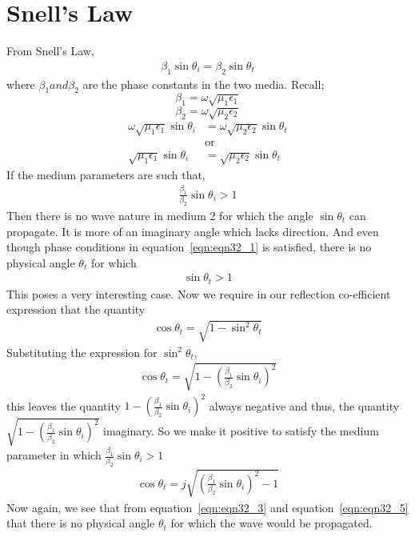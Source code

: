 \section{Snell's Law}
From Snell's Law,
\begin{align}
\beta_1 \sin\theta_i = \beta_2 \sin\theta_t
\label{eqn:eqn32_1}
\end{align}
where $\beta_1 and \beta_2$ are the phase constants in the two media. Recall;
$$ \beta_{1} = \omega\sqrt{\mu_{1}\epsilon_{1}}$$
$$ \beta_{2} = \omega\sqrt{\mu_{2}\epsilon_{2}}$$
\begin{align*}
\omega\sqrt{\mu_1\epsilon_{1}} \sin\theta_i &= \omega\sqrt{\mu_2\epsilon_2}  \sin\theta_t\\
&\text{or}\\
\sqrt{\mu_1\epsilon_{1}} \sin\theta_i &= \sqrt{\mu_2\epsilon_2}  \sin\theta_t
\end{align*}
If the medium parameters are such that,
\begin{align}
\frac{\beta_1}{\beta_2}\sin\theta_i > 1
\end{align}
Then there is no wave nature in medium 2 for which the angle $\sin\theta_t$ can propagate. It is more of an imaginary angle which lacks direction. And even though phase conditions in equation~\ref{eqn:eqn32_1} is satisfied, there is no physical angle $\theta_t$ for which
\begin{align}
\sin\theta_t > 1
\label{eqn:eqn32_3}
\end{align}
This poses a very interesting case. Now we require in our reflection co-efficient expression that the quantity
\begin{align}
\cos\theta_t = \sqrt{1-\sin^2\theta_t}
\end{align}
Substituting the expression for $\sin^{2}\theta_{t}$,
\begin{align*}
\cos\theta_t = \sqrt{1-(\frac{\beta_1}{\beta_2}\sin\theta_i)^2}
\end{align*}
this leaves the quantity $1 - (\frac{\beta_1}{\beta_2}\sin\theta_i)^2$ always negative and thus, the quantity $\sqrt{1 - (\frac{\beta_1}{\beta_2}\sin\theta_i)^2}$ imaginary. So we make it positive to satisfy the medium parameter in which $\frac{\beta_1}{\beta_2}\sin\theta_i > 1$
\begin{align}
\cos\theta_t = j\sqrt{(\frac{\beta_1}{\beta_2}\sin\theta_i)^2-1}
\label{eqn:eqn32_5}
\end{align}
Now again, we see that from equation~\ref{eqn:eqn32_3} and equation~\ref{eqn:eqn32_5} 
that there is no physical angle $\theta_t$ for which the wave would be propagated.

